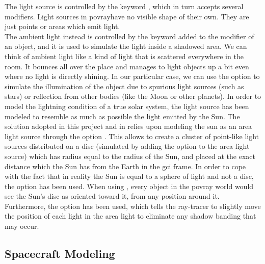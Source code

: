 The light source is controlled by the keyword , which in turn accepts several modifiers. Light sources in \acrshort{povray}have no visible shape of their own. They are just points or areas which emit light.\\
The ambient light instead is controlled by the keyword  added to the  modifier of an object, and it is used to simulate the light inside a shadowed area.
We can think of ambient light like a kind of light that is scattered everywhere in the room. It bounces all over the place and manages to light objects up a bit even where no light is directly shining.
In our particular case, we can use the  option to simulate the illumination of the object due to spurious light sources (such as stars) or reflection from other bodies (like the Moon or other planets).
In order to model the lightning condition of a true solar system, the light source has been modeled to resemble as much as possible the light emitted by the Sun.
The solution adopted in this project and in \cite{jacopo} relies upon modeling the sun as an area light source through the option . This allows to create a cluster of point-like light sources distributed on a disc (simulated by adding the  option to the area light source) which has radius equal to the radius of the Sun, and placed at the exact distance which the Sun has from the Earth in the \acrshort{gci} frame. In order to cope with the fact that in reality the Sun is equal to a sphere of light and not a disc, the option  has been used. When using , every object in the \acrshort{povray} world would see the Sun's disc as oriented toward it, from any position around it.
Furthermore, the option  has been used, which tells the ray-tracer to slightly move the position of each light in the area light to eliminate any shadow banding that may occur.

\subsection{Spacecraft Modeling}

